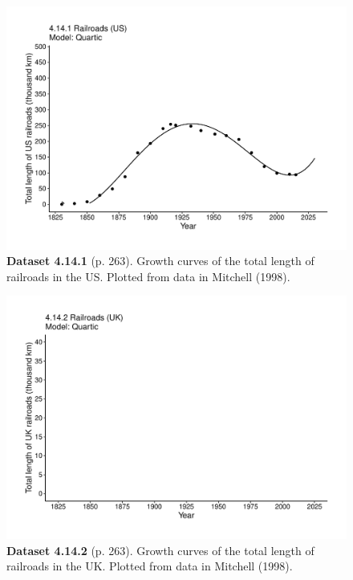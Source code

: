 \documentclass[aps,rmp,preprint,superscriptaddress,10pt,onecolumn]{article}
\begin{document}
\clearpage
\begin{figure}[h]
\includegraphics[width=\textwidth]{output/figs-ggplot/4.14.1.pdf}
\caption*{\textbf{Dataset 4.14.1} (p. 263). Growth curves of the total length of railroads in the US. Plotted from data in Mitchell (1998).}
\end{figure}
	
\clearpage
\begin{figure}[h]
\includegraphics[width=\textwidth]{output/figs-ggplot/4.14.2.pdf}
\caption*{\textbf{Dataset 4.14.2} (p. 263). Growth curves of the total length of railroads in the UK. Plotted from data in Mitchell (1998).}
\end{figure}
	
\end{document}
